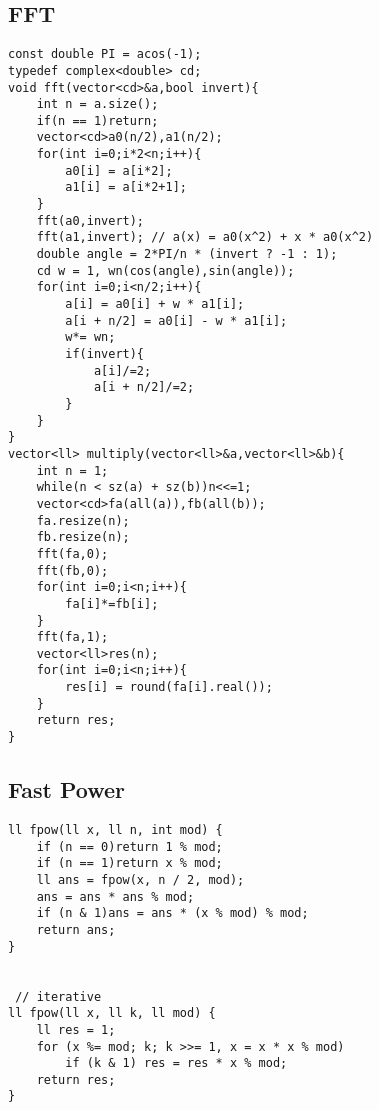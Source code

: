 \documentclass{article}
\begin{document}
\subsection{FFT}
\begin{verbatim}
const double PI = acos(-1);
typedef complex<double> cd;
void fft(vector<cd>&a,bool invert){
    int n = a.size();
    if(n == 1)return;
    vector<cd>a0(n/2),a1(n/2);
    for(int i=0;i*2<n;i++){
        a0[i] = a[i*2];
        a1[i] = a[i*2+1];
    }
    fft(a0,invert);
    fft(a1,invert); // a(x) = a0(x^2) + x * a0(x^2)
    double angle = 2*PI/n * (invert ? -1 : 1);
    cd w = 1, wn(cos(angle),sin(angle));
    for(int i=0;i<n/2;i++){
        a[i] = a0[i] + w * a1[i];
        a[i + n/2] = a0[i] - w * a1[i];
        w*= wn;
        if(invert){
            a[i]/=2;
            a[i + n/2]/=2;
        }
    }
}
vector<ll> multiply(vector<ll>&a,vector<ll>&b){
    int n = 1;
    while(n < sz(a) + sz(b))n<<=1;
    vector<cd>fa(all(a)),fb(all(b));
    fa.resize(n);
    fb.resize(n);
    fft(fa,0);
    fft(fb,0);
    for(int i=0;i<n;i++){
        fa[i]*=fb[i];
    }
    fft(fa,1);
    vector<ll>res(n);
    for(int i=0;i<n;i++){
        res[i] = round(fa[i].real());
    }
    return res;
}
\end{verbatim}

\subsection{Fast Power}
\begin{verbatim}
ll fpow(ll x, ll n, int mod) {  
    if (n == 0)return 1 % mod;  
    if (n == 1)return x % mod;  
    ll ans = fpow(x, n / 2, mod);  
    ans = ans * ans % mod;  
    if (n & 1)ans = ans * (x % mod) % mod;  
    return ans;  
}


 // iterative
ll fpow(ll x, ll k, ll mod) {
	ll res = 1;
	for (x %= mod; k; k >>= 1, x = x * x % mod)
		if (k & 1) res = res * x % mod;
	return res;
}
\end{verbatim}
\end{document}
